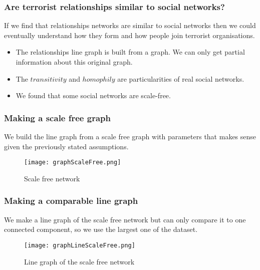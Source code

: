 \begin{frame}
\frametitle{Are terrorist relationships similar to social networks?}

If we find that relationships networks are similar to social networks then we could eventually understand how they form and how people join terrorist organisations.

\begin{itemize}
\item The relationships line graph is built from a graph. We can only get partial information about this original graph.
\item The $transitivity$ and $homophily$ are particularities of real social networks.
\item We found that some social networks are scale-free. 
\end{itemize}

\end{frame}


\begin{frame}
\frametitle{Making a scale free graph}

We build the line graph from a scale free graph with parameters that makes sense given the previously stated assumptions.

\begin{figure}[H]
\begin{center}
        \texttt{[image: graphScaleFree.png]}
        \caption{Scale free network}
        \label{fig:Scalefree}
        \end{center}
\end{figure}
\end{frame}
    

\begin{frame}
\frametitle{Making a comparable line graph}
We make a line graph of the scale free network but can only compare it to one connected component, so we use the largest one of the dataset.

\begin{figure}[H]
\begin{center}
    \texttt{[image: graphLineScaleFree.png]}
    \caption{Line graph of the scale free network}
    \label{fig:lineG}
\end{center}
\end{figure}
\end{frame}

